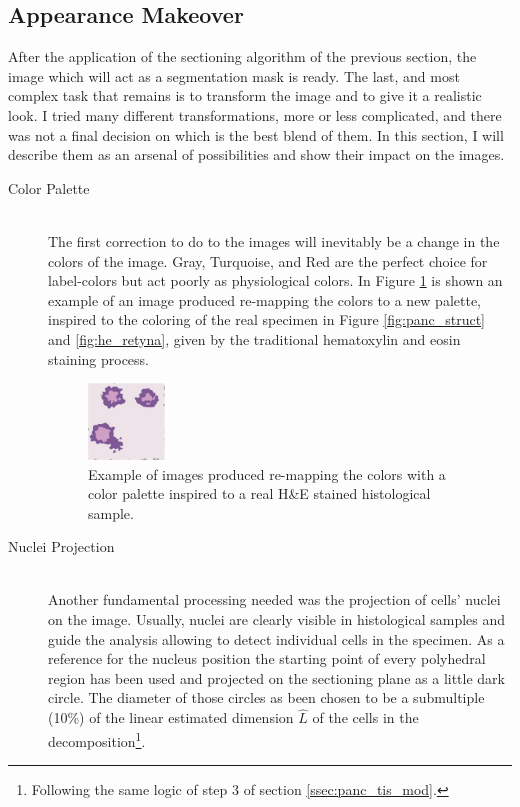 \subsection{Appearance Makeover} \label{ssec:app_mkov}
    After the application of the sectioning algorithm of the previous section, the image which will act as a segmentation mask is ready. The last, and most complex task that remains is to transform the image and to give it a realistic look. I tried many different transformations, more or less complicated, and there was not a final decision on which is the best blend of them. In this section, I will describe them as an arsenal of possibilities and show their impact on the images.

    \begin{description}
        \item [Color Palette] \hfill \\
        The first correction to do to the images will inevitably be a change in the colors of the image. Gray, Turquoise, and Red are the perfect choice for label-colors but act poorly as physiological colors. In Figure \ref{fig:new_palette} is shown an example of an image produced re-mapping the colors to a new palette, inspired to the coloring of the real specimen in Figure \ref{fig:panc_struct} and \ref{fig:he_retyna}, given by the traditional hematoxylin and eosin staining process.

        \begin{figure}[h]
            \centering
            \includegraphics[width = 0.2\textwidth]{images/new_palette}
            \caption{Example of images produced re-mapping the colors with a color palette inspired to a real H\&E stained histological sample.}
            \label{fig:new_palette}
        \end{figure}

        \item [Nuclei Projection] \hfill \\
        Another fundamental processing needed was the projection of cells' nuclei on the image. Usually, nuclei are clearly visible in histological samples and guide the analysis allowing to detect individual cells in the specimen. As a reference for the nucleus position the starting point of every polyhedral region has been used and projected on the sectioning plane as a little dark circle. The diameter of those circles as been chosen to be a submultiple (10\%) of the linear estimated dimension $\hat{L}$ of the cells in the decomposition\footnote{Following the same logic of step 3 of section \ref{ssec:panc_tis_mod}.}.


\end{description}
